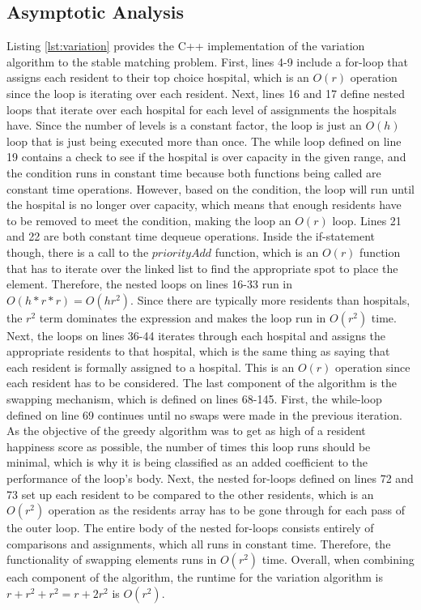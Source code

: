 \documentclass[letterpaper, 10pt,DIV=13]{scrartcl}
\numberwithin{equation}{section} %
\numberwithin{figure}{section} %
\numberwithin{table}{section} %
\begin{document}
\subsection{Asymptotic Analysis}
Listing \ref{lst:variation} provides the C++ implementation of the variation algorithm to the stable matching problem. First, lines 4-9 include a for-loop that assigns each resident to their top choice hospital, which is an $O(r)$ operation since the loop is iterating over each resident. Next, lines 16 and 17 define nested loops that iterate over each hospital for each level of assignments the hospitals have. Since the number of levels is a constant factor, the loop is just an $O(h)$ loop that is just being executed more than once. The while loop defined on line 19 contains a check to see if the hospital is over capacity in the given range, and the condition runs in constant time because both functions being called are constant time operations. However, based on the condition, the loop will run until the hospital is no longer over capacity, which means that enough residents have to be removed to meet the condition, making the loop an $O(r)$ loop. Lines 21 and 22 are both constant time dequeue operations. Inside the if-statement though, there is a call to the $priorityAdd$ function, which is an $O(r)$ function that has to iterate over the linked list to find the appropriate spot to place the element. Therefore, the nested loops on lines 16-33 run in $O(h * r * r) = O(hr^2)$. Since there are typically more residents than hospitals, the $r^2$ term dominates the expression and makes the loop run in $O(r^2)$ time. Next, the loops on lines 36-44 iterates through each hospital and assigns the appropriate residents to that hospital, which is the same thing as saying that each resident is formally assigned to a hospital. This is an $O(r)$ operation since each resident has to be considered. The last component of the algorithm is the swapping mechanism, which is defined on lines 68-145. First, the while-loop defined on line 69 continues until no swaps were made in the previous iteration. As the objective of the greedy algorithm was to get as high of a resident happiness score as possible, the number of times this loop runs should be minimal, which is why it is being classified as an added coefficient to the performance of the loop's body. Next, the nested for-loops defined on lines 72 and 73 set up each resident to be compared to the other residents, which is an $O(r^2)$ operation as the residents array has to be gone through for each pass of the outer loop. The entire body of the nested for-loops consists entirely of comparisons and assignments, which all runs in constant time. Therefore, the functionality of swapping elements runs in $O(r^2)$ time. Overall, when combining each component of the algorithm, the runtime for the variation algorithm is $r + r^2 + r^2 = r + 2r^2$ is $O(r^2)$.
\end{document}
